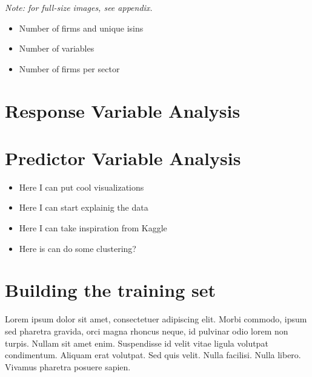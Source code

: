 \noindent \textit{Note: for full-size images, see appendix.}
\newpage 

\begin{itemize}
    \item Number of firms and unique isins
    \item Number of variables
    \item Number of firms per sector
\end{itemize}

\section{Response Variable Analysis}

\section{Predictor Variable Analysis}
\begin{itemize}
    \item Here I can put cool visualizations
    \item Here I can start explainig the data
    \item Here I can take inspiration from Kaggle
    \item Here is can do some clustering?
\end{itemize}
\section{Building the training set}

    
Lorem ipsum dolor sit amet, consectetuer adipiscing elit. Morbi commodo, ipsum sed pharetra gravida, orci magna rhoncus neque, id pulvinar odio lorem non turpis. Nullam sit amet enim. Suspendisse id velit vitae ligula volutpat condimentum. Aliquam erat volutpat. Sed quis velit. Nulla facilisi. Nulla libero. Vivamus pharetra posuere sapien. 
